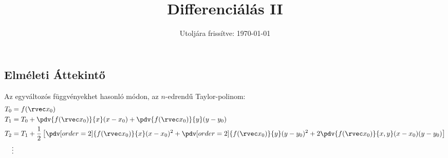 \documentclass[a4paper, 12pt]{scrartcl}
\title{Differenciálás II}
\date{Utoljára frissítve: \today}
\begin{document}
\maketitle
\subsection{Elméleti Áttekintő}

\begin{blueBox}

  Az egyváltozós függvényekhet hasonló módon, az $n$-edrendű Taylor-polinom:
  \begin{align*}
    T_0 & = f(\rvec x_0)
    \\
    T_1 & = T_0
    + \pdv{f(\rvec x_0)}{x}(x - x_0)
    + \pdv{f(\rvec x_0)}{y}(y - y_0)
    \\
    T_2 & = T_1 + \frac{1}{2} \left[
      \pdv[order=2]{f(\rvec x_0)}{x}(x - x_0)^2
      + \pdv[order=2]{f(\rvec x_0)}{y}(y - y_0)^2
      + 2 \pdv{f(\rvec x_0)}{x,y}(x - x_0)(y - y_0)
    \right]
    \\
        & \vdots
  \end{align*}
\end{blueBox}
\end{document}

